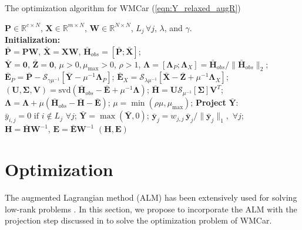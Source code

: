 \documentclass[10pt,journal,compsoc]{IEEEtran}
\begin{document}
\begin{algorithm}
  \caption{The optimization algorithm for WMCar (\ref{eqn:Y_relaxed_augR})}
  \begin{algorithmic}[1]
    \Require
     $\mathbf{P} \in \mathbb{R}^{c \times N}$, $\mathbf{X} \in \mathbb{R}^{m \times N}$, $\mathbf{W} \in \mathbb{R}^{N \times N}$, $L_j \, \forall j$, $\lambda$, and $\gamma$.\\
    \textbf{Initialization:}\\ $\bar{\mathbf{P}} = \mathbf{P} \mathbf{W}$, $\bar{\mathbf{X}} = \mathbf{X} \mathbf{W}$, $\bar{\mathbf{H}}_{obs} = [\bar{\mathbf{P}}; \bar{\mathbf{X}}] $; \\
    $\bar{\mathbf{Y}}=\mathbf{0}$, $\bar{\mathbf{Z}} = \mathbf{0}$, $\mu > 0, \mu_{\max} > 0$,  $\rho > 1$, $\mathbf{\Lambda} = [\mathbf{\Lambda}_P; \mathbf{\Lambda}_X] = \bar{\mathbf{H}}_{obs} / \| \bar{\mathbf{H}}_{obs}\|_2$;
      \State $\bar{\mathbf{E}}_P = \bar{\mathbf{P}} - \mathcal{S}_{\gamma \mu^{-1}}[ \bar{\mathbf{Y}} - \mu^{-1} \mathbf{\Lambda}_P]$;
      \State $\bar{\mathbf{E}}_X = \mathcal{S}_{\lambda \mu^{-1}}[ \bar{\mathbf{X}} - \bar{\mathbf{Z}} + \mu^{-1} \mathbf{\Lambda}_X]$;
      \State $(\mathbf{U}, \mathbf{\Sigma}, \mathbf{V}) = \mathrm{svd}\left(\bar{\mathbf{H}}_{obs} - \bar{\mathbf{E}} + \mu^{-1} \mathbf{\Lambda}\right)$;
      \State $\bar{\mathbf{H}} = \mathbf{U} \mathcal{S}_{\mu^{-1}}[\mathbf{\Sigma}] \mathbf{V}^T $;
      \State $\mathbf{\Lambda} = \mathbf{\Lambda} + \mu \left(\bar{\mathbf{H}}_{obs} - \bar{\mathbf{H}} - \bar{\mathbf{E}} \right)$;
      \State $\mu = \min(\rho \mu , \mu_{\max} )$;
      \State \textbf{Project} $\bar{\mathbf{Y}}$:
      \State $\bar{y}_{i,j} = 0 \,\, \mathrm{if}   \,\, i \notin L_j \,\, \forall j$;
      \State $\bar{\mathbf{Y}} = \max(\bar{\mathbf{Y}}, 0)$;
      \State $\bar{\mathbf{y}}_j = w_{j,j} \,\bar{\mathbf{y}}_j / \|\bar{\mathbf{y}}_j\|_1,$ $\forall j$;
      \EndWhile\\
    $\mathbf{H} = \bar{\mathbf{H}} \mathbf{W}^{-1}$, $\mathbf{E} = \bar{\mathbf{E}} \mathbf{W}^{-1}$
    \Ensure
        $(\mathbf{H}, \mathbf{E})$
    \end{algorithmic}\label{alg:alm_W}
\end{algorithm}

\section{Optimization}\label{MCar_sec:opt}
The augmented Lagrangian method (ALM) has been extensively used for solving low-rank problems \cite{Candes2011,Lin2009}.
In this section, we propose to incorporate the ALM with the projection step discussed in \cite{Goldberg2010,Cabral2011} to solve the optimization problem of WMCar.
\end{document}
